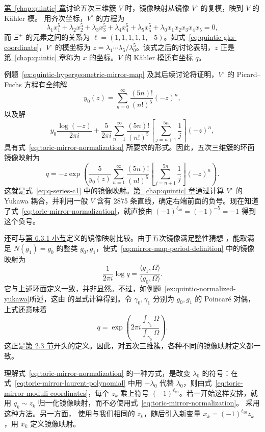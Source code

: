 \begin{example}\label{ex:quintic-toric-mirror-map}
\hyperref[chap:quintic]{第~\ref*{chap:quintic} 章}讨论五次三维簇 $V$ 时，镜像映射从镜像 $V^\circ$ 的复模，映到 $V$ 的 Kähler 模。
用齐次坐标，$V^\circ$ 的方程为
\[
\lambda_1x_1^5+\lambda_2x_2^5+\lambda_3x_3^5+\lambda_4x_4^5+\lambda_5x_5^5
+\lambda_0x_1x_2x_3x_4x_5=0,
\]
而 $\Xi^+$ 的元素之间的关系为 $\ell=(1,1,1,1,1,-5)$。如式~\eqref{eq:quintic-gkz-coordinate}，$V^\circ$ 的模坐标为 $z=\lambda_1\cdots\lambda_5/\lambda_0^5$。该式之后的讨论表明，$z$ 正是\hyperref[chap:quintic]{第~\ref*{chap:quintic} 章}称为 $x$ 的坐标。$V$ 的 Kähler 模还有坐标 $q$。

例题~\ref{ex:quintic-hypergeometric-mirror-map} 及其后续讨论将证明，$V^\circ$ 的 Picard--Fuchs 方程有全纯解
\[
y_0(z)=\sum_{n=0}^\infty\frac{(5n)!}{(n!)^5}(-z)^n,
\]
以及解
\[
y_0\frac{\log(-z)}{2\pi i}
+\frac5{2\pi i}\sum_{n=1}^\infty\frac{(5n)!}{(n!)^5}
\left[\sum_{j=n+1}^{5n}\frac1j\right](-z)^n,
\]
具有式~\eqref{eq:toric-mirror-normalization} 所要求的形式。因此，五次三维簇的环面镜像映射为
\[
q=-z\exp\left(\frac5{y_0(z)}\sum_{n=1}^\infty\frac{(5n)!}{(n!)^5}
\left[\sum_{j=n+1}^{5n}\frac1j\right](-z)^n\right).
\]
这就是式~\eqref{eq:q-series-c1} 中的镜像映射。\hyperref[chap:quintic]{第~\ref*{chap:quintic} 章}通过计算 $V^\circ$ 的 Yukawa 耦合，并利用一般 $V$ 含有 2875 条直线，确定右端前面的负号。现在知道了式~\eqref{eq:toric-mirror-normalization}，就直接由 $(-1)^{\ell_{k0}}=\allowbreak(-1)^{-5}=-1$ 得到这个负号。

还可与\hyperref[subsec:mirror-map-definition]{第 6.3.1 小节}定义的镜像映射比较。由于五次镜像满足整性猜想 ，能取满足 $N(g_1)=g_0$ 的整类 $g_0,g_1$，使式~\eqref{eq:mirror-map-period-definition} 中的镜像映射为
\[
\frac1{2\pi i}\log q=\frac{\langle g_1,\Omega\rangle}{\langle g_0,\Omega\rangle}.
\]
它与上述环面定义一致，并非显然。不过，如\hyperref[ex:quintic-normalized-yukawa]{例题~\ref*{ex:quintic-normalized-yukawa}}所述，这由  的显式计算得到。令 $\gamma_0,\gamma_1$ 分别为 $g_0,g_1$ 的 Poincaré 对偶，上式还意味着
\[
q=\exp\left(2\pi i\frac{\int_{\gamma_1}\Omega}{\int_{\gamma_0}\Omega}\right).
\]
这正是\hyperref[sec:quintic-mirror-map]{第 2.3 节}开头的定义。因此，对五次三维簇，各种不同的镜像映射定义都一致。
\end{example}

理解式~\eqref{eq:toric-mirror-normalization} 的一种方式，是改变 $\lambda_0$ 的符号：在式~\eqref{eq:toric-mirror-laurent-polynomial} 中用 $-\lambda_0$ 代替 $\lambda_0$，则由式~\eqref{eq:toric-mirror-moduli-coordinates}，每个 $z_k$ 乘上符号 $(-1)^{\ell_{k0}}$。若一开始这样安排，就用 $q_k\sim z_k$ 归一化镜像映射，而不必使用式~\eqref{eq:toric-mirror-normalization}。 采用这种方法。另一方面， 使用与我们相同的 $z_k$，随后引入新变量 $x_k=(-1)^{\ell_{k0}}z_k$，用 $x_k$ 定义镜像映射。


